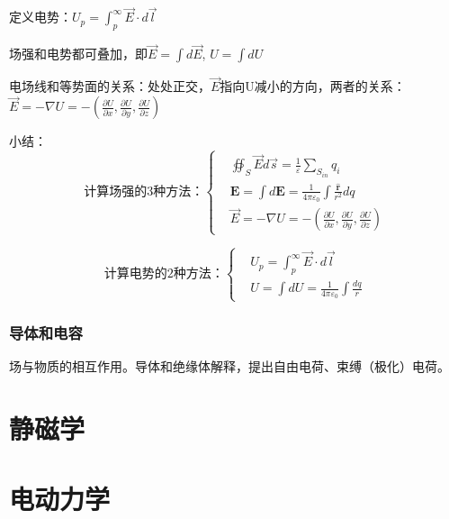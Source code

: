 \documentclass[UTF8]{../06-Physics}
\begin{document}
定义电势：$U_p = \int _p ^ \infty \vec{E} \cdot d \vec{l} $

场强和电势都可叠加，即$\vec{E} = \int d \vec{E}$, $U = \int dU$

电场线和等势面的关系：处处正交，$\vec{E}$指向U减小的方向，两者的关系：$\vec{E} = -\nabla U = - (\frac{\partial U }{\partial x},\frac{\partial U }{\partial y},\frac{\partial U }{\partial z})$





小结：
\begin{equation}
    \mbox{计算场强的3种方法：}
    \left\{ 
        \begin{aligned}
            &\oiint _S  \vec{E}d \vec{s}  = \frac{1}{\varepsilon} \sum_{S_{in}} q_i\\
            &\boldsymbol E =  \int d \boldsymbol E
            = \frac{1}{4 \pi \varepsilon _0} \int \frac{\boldsymbol {\hat{r} } }{r^2} dq\\
            &\vec{E} = -\nabla U = - (\frac{\partial U }{\partial x},\frac{\partial U }{\partial y},\frac{\partial U }{\partial z})
        \end{aligned}
    \right.
\end{equation}

\begin{equation}
    \mbox{计算电势的2种方法：}
    \left\{ 
        \begin{aligned}
            &U_p = \int _p ^ \infty \vec{E} \cdot d \vec{l}\\
            &U = \int dU = \frac{1}{4 \pi \varepsilon _0} \int \frac{dq}{r}
        \end{aligned}
    \right.
\end{equation}


\subsection{导体和电容}

场与物质的相互作用。导体和绝缘体解释，提出自由电荷、束缚（极化）电荷。


\chapter{静磁学}


\chapter{电动力学} %
\end{document}
